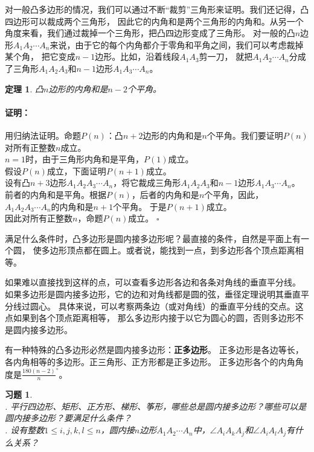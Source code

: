 \documentclass[12pt,UTF8]{ctexbook}
\newtheorem{tm}{定理}[section]
\newtheorem{xt}{习题}[section]
\renewenvironment{proof}{\paragraph{\textbf{证明：}}}{\hfill$\square$}
\begin{document}
对一般凸多边形的情况，我们可以通过不断“裁剪”三角形来证明。我们还记得，凸四边形可以裁成两个三角形，
因此它的内角和是两个三角形的内角和。从另一个角度来看，我们通过裁掉一个三角形，把凸四边形变成了三角形。
对一般的凸$n$边形$A_1A_2\cdots A_n$来说，由于它的每个内角都介于零角和平角之间，我们可以考虑裁掉某个角，
把它变成$n-1$边形。比如，沿着线段$A_1A_3$剪一刀，
就把$A_1A_2\cdots A_n$分成了三角形$A_1A_2A_3$和$n-1$边形$A_1A_3\cdots A_n$。

\begin{tm}\label{tm:1-4-0}
    凸$n$边形的内角和是$n-2$个平角。
\end{tm}
\begin{proof}
    用归纳法证明。命题$P(n)$：凸$n+2$边形的内角和是$n$个平角。我们要证明$P(n)$对所有正整数$n$成立。\\
    $n=1$时，由于三角形内角和是平角，$P(1)$成立。\\
    假设$P(n)$成立，下面证明$P(n+1)$成立。\\
    设有凸$n+3$边形$A_1A_2A_3\cdots A_n$，将它裁成三角形$A_1A_2A_3$和$n-1$边形$A_1A_3\cdots A_n$。
    前者的内角和是平角。根据$P(n)$，后者的内角和是$n$个平角，因此，$A_1A_2A_3\cdots A_n$的内角和是$n+1$个平角。
    于是$P(n+1)$成立。\\
    因此对所有正整数$n$，命题$P(n)$成立。
\end{proof}

满足什么条件时，凸多边形是圆内接多边形呢？最直接的条件，自然是平面上有一个圆，
使多边形顶点都在圆上。或者说，能找到一点，到多边形各个顶点距离相等。

如果难以直接找到这样的点，可以查看多边形各边和各条对角线的垂直平分线。
如果多边形是圆内接多边形，它的边和对角线都是圆的弦，垂径定理说明其垂直平分线过圆心。
具体来说，可以考察两条边（或对角线）的垂直平分线的交点。这点如果到各个顶点距离相等，
那么多边形内接于以它为圆心的圆，否则多边形不是圆内接多边形。

有一种特殊的凸多边形必然是圆内接多边形：\textbf{正多边形}。
正多边形是各边等长，各内角相等的多边形。正三角形、正方形都是正多边形。
正多边形各个的内角角度是$\frac{180(n-2)}{n}^\circ$。

\begin{xt}\label{xt:1-4-0}
    \mbox{}\\
    . 平行四边形、矩形、正方形、梯形、筝形，哪些总是圆内接多边形？哪些可以是圆内接多边形？要满足什么条件？\\
    . 设有整数$1 \leqslant i,j,k,l \leqslant n$，圆内接$n$边形$A_1A_2\cdots A_n$中，$\angle A_iA_kA_j$和$\angle A_iA_lA_j$有什么关系？
\end{xt}
\end{document}
